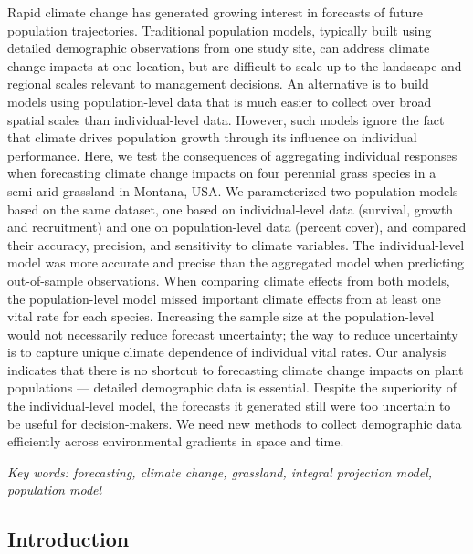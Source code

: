 \documentclass[12pt,]{article}
\begin{document}
Rapid climate change has generated growing interest in forecasts of
future population trajectories. Traditional population models, typically
built using detailed demographic observations from one study site, can
address climate change impacts at one location, but are difficult to
scale up to the landscape and regional scales relevant to management
decisions. An alternative is to build models using population-level data
that is much easier to collect over broad spatial scales than
individual-level data. However, such models ignore the fact that climate
drives population growth through its influence on individual
performance. Here, we test the consequences of aggregating individual
responses when forecasting climate change impacts on four perennial
grass species in a semi-arid grassland in Montana, USA. We parameterized
two population models based on the same dataset, one based on
individual-level data (survival, growth and recruitment) and one on
population-level data (percent cover), and compared their accuracy,
precision, and sensitivity to climate variables. The individual-level
model was more accurate and precise than the aggregated model when
predicting out-of-sample observations. When comparing climate effects
from both models, the population-level model missed important climate
effects from at least one vital rate for each species. Increasing the
sample size at the population-level would not necessarily reduce
forecast uncertainty; the way to reduce uncertainty is to capture unique
climate dependence of individual vital rates. Our analysis indicates
that there is no shortcut to forecasting climate change impacts on plant
populations --- detailed demographic data is essential. Despite the
superiority of the individual-level model, the forecasts it generated
still were too uncertain to be useful for decision-makers. We need new
methods to collect demographic data efficiently across environmental
gradients in space and time.

\emph{Key words: forecasting, climate change, grassland, integral
projection model, population model}

\newpage{}

\subsection{Introduction}\label{introduction}
\end{document}
